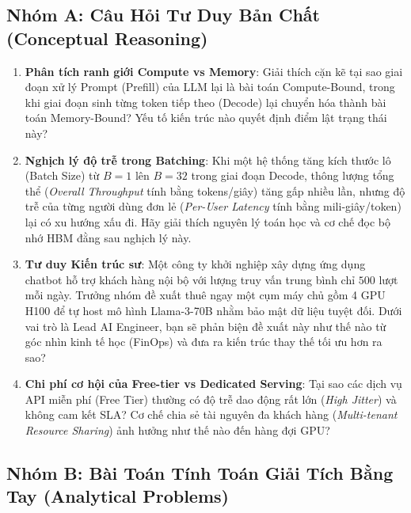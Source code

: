 \subsection{Nhóm A: Câu Hỏi Tư Duy Bản Chất (Conceptual Reasoning)}

\begin{enumerate}[label=\textbf{A\arabic*.}]
  \item \textbf{Phân tích ranh giới Compute vs Memory}: Giải thích cặn kẽ tại sao giai đoạn xử lý Prompt (Prefill) của LLM lại là bài toán Compute-Bound, trong khi giai đoạn sinh từng token tiếp theo (Decode) lại chuyển hóa thành bài toán Memory-Bound? Yếu tố kiến trúc nào quyết định điểm lật trạng thái này?
  \item \textbf{Nghịch lý độ trễ trong Batching}: Khi một hệ thống tăng kích thước lô (Batch Size) từ $B=1$ lên $B=32$ trong giai đoạn Decode, thông lượng tổng thể (\textit{Overall Throughput} tính bằng tokens/giây) tăng gấp nhiều lần, nhưng độ trễ của từng người dùng đơn lẻ (\textit{Per-User Latency} tính bằng mili-giây/token) lại có xu hướng xấu đi. Hãy giải thích nguyên lý toán học và cơ chế đọc bộ nhớ HBM đằng sau nghịch lý này.
  \item \textbf{Tư duy Kiến trúc sư}: Một công ty khởi nghiệp xây dựng ứng dụng chatbot hỗ trợ khách hàng nội bộ với lượng truy vấn trung bình chỉ $500$ lượt mỗi ngày. Trưởng nhóm đề xuất thuê ngay một cụm máy chủ gồm 4 GPU H100 để tự host mô hình Llama-3-70B nhằm bảo mật dữ liệu tuyệt đối. Dưới vai trò là Lead AI Engineer, bạn sẽ phản biện đề xuất này như thế nào từ góc nhìn kinh tế học (FinOps) và đưa ra kiến trúc thay thế tối ưu hơn ra sao?
  \item \textbf{Chi phí cơ hội của Free-tier vs Dedicated Serving}: Tại sao các dịch vụ API miễn phí (Free Tier) thường có độ trễ dao động rất lớn (\textit{High Jitter}) và không cam kết SLA? Cơ chế chia sẻ tài nguyên đa khách hàng (\textit{Multi-tenant Resource Sharing}) ảnh hưởng như thế nào đến hàng đợi GPU?
\end{enumerate}

\subsection{Nhóm B: Bài Toán Tính Toán Giải Tích Bằng Tay (Analytical Problems)}

